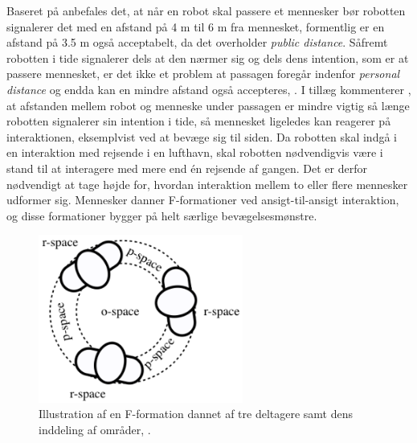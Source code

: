Baseret på \textcite[ss. 169-170]{PDF:HumanRobotEmodiedInteraction} anbefales det, at når en robot skal passere et mennesker bør robotten signalerer det med en afstand på 4 m til 6 m fra mennesket, formentlig er en afstand på 3.5 m også acceptabelt, da det overholder \textit{public distance}. Såfremt robotten i tide signalerer dels at den nærmer sig og dels dens intention, som er at passere mennesket, er det ikke et problem at passagen foregår indenfor \textit{personal distance} og endda kan en mindre afstand også accepteres, \parencite[s. 170]{PDF:HumanRobotEmodiedInteraction}. I tillæg kommenterer \textcite[s. 170]{PDF:HumanRobotEmodiedInteraction}, at afstanden mellem robot og menneske under passagen er mindre vigtig så længe robotten signalerer sin intention i tide, så mennesket ligeledes kan reagerer på interaktionen, eksemplvist ved at bevæge sig til siden.\blankline
%
Da robotten skal indgå i en interaktion med rejsende i en lufthavn, skal robotten nødvendigvis være i stand til at interagere med mere end én rejsende af gangen. Det er derfor nødvendigt at tage højde for, hvordan interaktion mellem to eller flere mennesker udformer sig. Mennesker danner F-formationer ved ansigt-til-ansigt interaktion, \parencite[s. 445]{PDF:UsingFFormations} og disse formationer bygger på helt særlige bevægelsesmønstre.
%
\begin{figure}[H]
\centering
\includegraphics[width = 0.60\textwidth]{Figure/Introduktion/F-Formation} 
\caption{Illustration af en F-formation dannet af tre deltagere samt dens inddeling af områder, \parencite[s. 446]{PDF:UsingFFormations}.}
\label{fig:F-Formation}
\end{figure}
\noindent 
%
